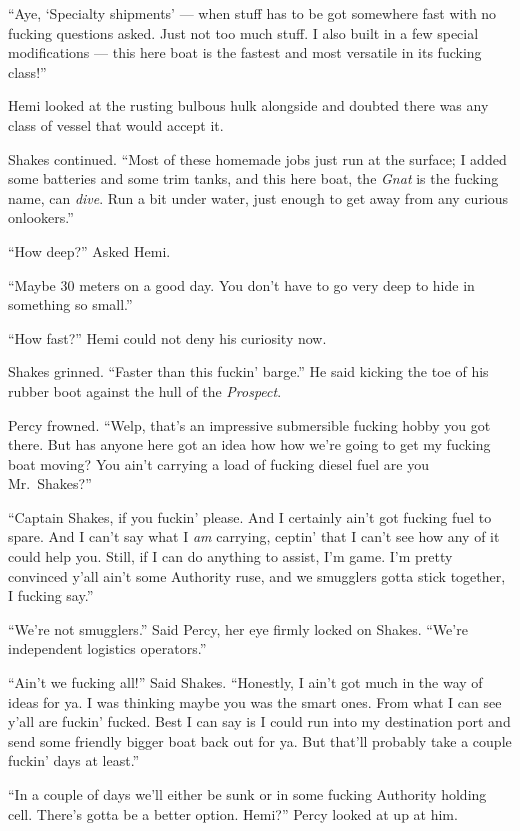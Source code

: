 \documentclass[]{scrbook}
\begin{document}
``Aye, `Specialty shipments' --- when stuff has to be got somewhere fast
with no fucking questions asked. Just not too much stuff. I also built
in a few special modifications --- this here boat is the fastest and
most versatile in its fucking class!''

Hemi looked at the rusting bulbous hulk alongside and doubted there was
any class of vessel that would accept it.

Shakes continued. ``Most of these homemade jobs just run at the surface;
I added some batteries and some trim tanks, and this here boat, the
\emph{Gnat} is the fucking name, can \emph{dive}. Run a bit under water,
just enough to get away from any curious onlookers.''

``How deep?'' Asked Hemi.

``Maybe 30 meters on a good day. You don't have to go very deep to hide
in something so small.''

``How fast?'' Hemi could not deny his curiosity now.

Shakes grinned. ``Faster than this fuckin' barge.'' He said kicking the
toe of his rubber boot against the hull of the \emph{Prospect}.

Percy frowned. ``Welp, that's an impressive submersible fucking hobby
you got there. But has anyone here got an idea how how we're going to
get my fucking boat moving? You ain't carrying a load of fucking diesel
fuel are you Mr.~Shakes?''

``Captain Shakes, if you fuckin' please. And I certainly ain't got
fucking fuel to spare. And I can't say what I \emph{am} carrying,
ceptin' that I can't see how any of it could help you. Still, if I can
do anything to assist, I'm game. I'm pretty convinced y'all ain't some
Authority ruse, and we smugglers gotta stick together, I fucking say.''

``We're not smugglers.'' Said Percy, her eye firmly locked on Shakes.
``We're independent logistics operators.''

``Ain't we fucking all!'' Said Shakes. ``Honestly, I ain't got much in
the way of ideas for ya. I was thinking maybe you was the smart ones.
From what I can see y'all are fuckin' fucked. Best I can say is I could
run into my destination port and send some friendly bigger boat back out
for ya. But that'll probably take a couple fuckin' days at least.''

``In a couple of days we'll either be sunk or in some fucking Authority
holding cell. There's gotta be a better option. Hemi?'' Percy looked at
up at him.
\end{document}
